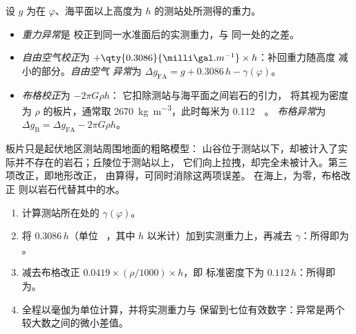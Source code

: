 \begin{definition}[重力异常]\label{def:b1:isostasy-gravity:anomalies}
设 $g$ 为在 $\varphi$、海平面以上高度为
$h$ 的测站处所测得的重力。
\begin{itemize}
  \item \emph{重力异常}是
        校正到同一水准面后的实测重力，与
        同一处的之差。
  \item \emph{自由空气校正}为
        $+\qty{0.3086}{\milli\gal.m^{-1}}\times h$：补回重力随高度
        减小的部分。\emph{自由空气
        异常}为
        $\Delta g_{\mathrm{FA}} = g + 0.3086\,h - \gamma(\varphi)$。
  \item \emph{布格校正}为 $-2\pi G\rho h$：
        它扣除测站与海平面之间岩石的引力，
        将其视为密度为 $\rho$ 的板片，通常取
        \qty{2670}{kg.m^{-3}}，此时每米为 \qty{0.112}{\milli\gal}。
        \emph{布格异常}为
        $\Delta g_{\mathrm B} = \Delta g_{\mathrm{FA}} - 2\pi G\rho h$。
\end{itemize}
\end{definition}

板片只是起伏地区测站周围地面的粗略模型：
山谷位于测站以下，却被计入了实际并不存在的岩石；丘陵位于测站以上，
它们向上拉拽，却完全未被计入。第三项改正，即地形改正，
由算得，可同时消除这两项误差。
在海上，为零，布格改正
则以岩石代替其中的水。

\begin{method}[重力读数的改正]\label{met:b1:isostasy-gravity:reduction}
\begin{enumerate}
  \item 计算测站所在处的 $\gamma(\varphi)$。
  \item 将 $0.3086\,h$（单位 \unit{\milli\gal}，其中 $h$
        以米计）加到实测重力上，再减去 $\gamma$：所得即为
        。
  \item 减去布格改正 $0.0419\times(\rho/1000)\times h$，即
        标准密度下为 $0.112\,h$：所得即为。
  \item 全程以毫伽为单位计算，并将实测重力与
        保留到七位有效数字：异常是两个
        较大数之间的微小差值。
\end{enumerate}
\end{method}

